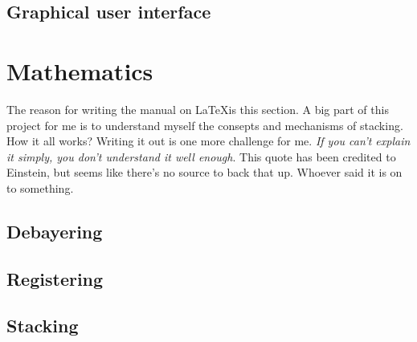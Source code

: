 \documentclass[twoside,a4paper]{refart}
\begin{document}
\subsection{Graphical user interface}

\newpage
\section{Mathematics}
\label{mathematics}

The reason for writing the manual on \LaTeX is this section. A big part of this project for me is to understand myself the
consepts and mechanisms of stacking. How it all works? Writing it out is one more challenge for me. \emph{If you can't 
explain it simply, you don't understand it well enough}. This quote has been credited to Einstein, but seems like there's
no source to back that up. Whoever said it is on to something.



\subsection{Debayering}
\label{debayeringmath}

\subsection{Registering}
\label{registeringmath}

\subsection{Stacking}
\label{stackingmath}

\printindex
\end{document}

